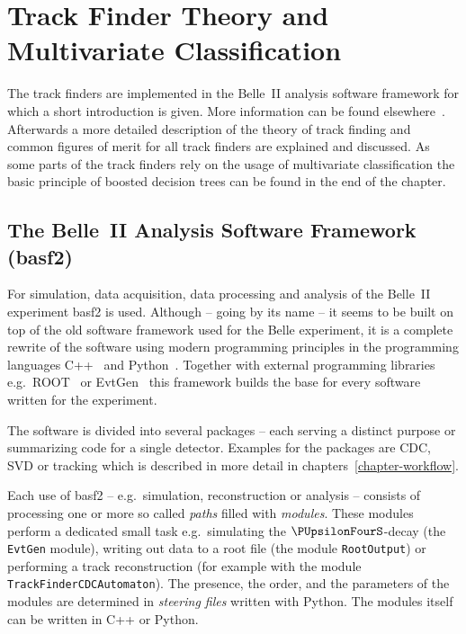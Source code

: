 \chapter{Track Finder Theory and Multivariate Classification} \label{chapter-theory}

The track finders are implemented in the Belle~II analysis software framework for which a short introduction is given. More information can be found elsewhere~\cite{moll_basf2}. Afterwards a more detailed description of the theory of track finding and common figures of merit for all track finders are explained and discussed. As some parts of the track finders rely on the usage of multivariate classification the basic principle of boosted decision trees can be found in the end of the chapter.

\section{The Belle~II Analysis Software Framework (basf2)}

For simulation, data acquisition, data processing and analysis of the Belle~II experiment basf2 is used. Although -- going by its name -- it seems to be built on top of the old software framework used for the Belle experiment, it is a complete rewrite of the software using modern programming principles in the programming languages C++~\cite{cpp} and Python~\cite{python}. Together with external programming libraries e.g.\ ROOT~\cite{root} or EvtGen~\cite{evtgen} this framework builds the base for every software written for the experiment.

The software is divided into several packages -- each serving a distinct purpose or summarizing code for a single detector. Examples for the packages are CDC, SVD or tracking which is described in more detail in chapters~\ref{chapter-workflow}.

Each use of basf2 -- e.g.\ simulation, reconstruction or analysis -- consists of processing one or more so called \emph{paths} filled with \emph{modules}. These modules perform a dedicated small task e.g.\ simulating the $\PUpsilonFourS$-decay (the \texttt{EvtGen} module), writing out data to a root file (the module \texttt{RootOutput}) or performing a track reconstruction (for example with the module \texttt{TrackFinderCDCAutomaton}). The presence, the order, and the parameters of the modules are determined in \emph{steering files} written with Python. The modules itself can be written in C++ or Python. 

